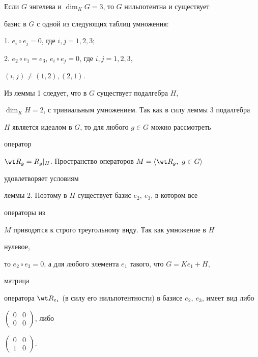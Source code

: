  


\begin{cor} 


Если $G$ энгелева и $\dim_K G=3$, то $G$ нильпотентна и существует 


базис в $G$ с одной из следующих таблиц умножения: 


 


1. $e_i\circ e_j=0$, где $i,j=1,2,3$; 


 


2. $e_2\circ e_1=e_3$, $e_i\circ e_j=0$, где $i,j=1,2,3$, 


$(i,j)\ne(1,2),(2,1)$. 


\end{cor} 


 


\begin{pf} 


Из леммы 1 следует, что в $G$ существует подалгебра $H$, 


$\dim_K H=2$, с тривиальным умножением. Так как в силу леммы 3 подалгебра 


$H$ является идеалом в $G$, то для любого $g\in G$ можно рассмотреть 


оператор 


$\wt R_g=R_g|_H$. Пространство операторов $M=\la\wt R_g,\ g\in G\ra$ 


удовлетворяет условиям 


леммы 2. Поэтому в $H$ существует базис $e_2,\ e_3$, в котором все 


операторы из 


$M$ приводятся к строго треугольному виду. Так как умножение в $H$ 


нулевое, 


то $e_2\circ e_3=0$, а для любого элемента $e_1$ такого, что $G=K {e_1}+H$, 


матрица 


оператора $\wt R_{e_1}$ (в силу его нильпотентности) в базисе $e_2,\ 


e_3$, имеет вид либо 


$\left(\begin{smallmatrix} 0&0 \\ 0&0\end{smallmatrix}\right)$, либо


$\left(\begin{smallmatrix} 0&0 \\ 1 & 0\end{smallmatrix}\right)$. 


\end{pf}


